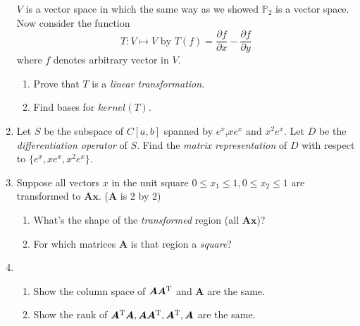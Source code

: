 \begin{enumerate}
$V$ is a vector space in which the same way as we showed $\mathbb{P}_2$ is a vector space.\\
Now consider the function
\[
T:V\mapsto V\text{ by }T(f)=\frac{\partial f}{\partial x}-\frac{\partial f}{\partial y}
\]
where $f$ denotes  arbitrary vector in $V$.
\begin{enumerate}
\item
Prove that $T$ is a \textit{linear transformation}.
\item
Find bases for $kernel(T)$.
\end{enumerate}
\item
Let $S$ be the subspace of $C[a,b]$ spanned by $e^x$,$xe^x$ and $x^2e^x$. Let $D$ be the \textit{differentiation
operator} of $S$. 
Find the \textit{matrix representation} of $D$ with respect to $\{e^x,xe^x,x^2e^x\}$.
\item
Suppose all vectors $x$ in the unit square $0\le x_1\le 1,0\le x_2\le 1$ are transformed to $\bm{Ax}.$
($\bm A$ is 2 by 2)
\begin{enumerate}
\item
What's the shape of the \textit{transformed} region (all $\bm{Ax}$)?
\item
For which matrices $\bm A$ is that region a \textit{square}?
\end{enumerate}
\item
\begin{enumerate}
\item
Show the column space of $\bm A\bm A^{\mathrm T}$ and $\bm A$ are the same.
\item
Show the rank of $\bm A^{\mathrm T}\bm A,\bm A\bm A^{\mathrm T},\bm A^{\mathrm T},\bm A$ are the same.
\end{enumerate}
\end{enumerate}